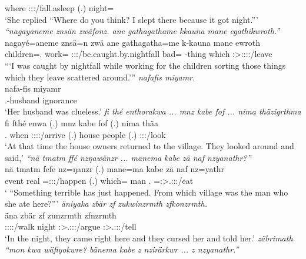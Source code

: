 \begin{exe}
	where {\Fut} \Med{} {\Emph} \Fsg:\Sbj:\Rpst:\Pfv/fall.asleep (.) night=\Char\\
	\trans `She replied ``Where do you think? I slept there because it got night.'''
	\emph{``nagayaneme znsän zwäfonz. ane gathagathame kkauna mane egathikwroth.''}\\
	\gll nagayé=aneme znsä=n zwä ane gathagatha=me k-kauna mane ewroth\\
	children=\Poss.{\Nsg} work={\Loc} \Fsg:\Sbj:\Rpst:\Pfv/be.caught.by.nightfall {\Dem} bad={\Ins} \Redup-thing which \Pl:\Sbj>\Stpl:\Obj:\Nonpast:\Ipfv:\Andat/leave\\
	\trans ```I was caught by nightfall while working for the children sorting those things which they leave scattered around.'''
	\emph{nafafis miyamr.}\\
	\gll nafa-fis miyamr\\
	\Third.\Poss-husband ignorance\\
	\trans `Her husband was clueless.'
	\emph{fi thé enthorakwa ... mnz kabe fof ... nima thäzigrthma}\\
	\gll fi fthé enwa (.) mnz kabe fof (.) nima thäa\\
	\Third.{\Abs} when \Stpl:\Sbj:\Pst:\Ipfv:\Venit/arrive (.) house people {\Emph} (.) {\Quot} \Stpl:\Sbj:\Pst:\Pfv/look\\
	\trans `At that time the house owners returned to the village. They looked around and said,'
	\emph{``nä tmatm ffé nzŋawänzr ... manema kabe zä naf nzyanathr?''}\\
	\gll nä tmatm fefe nz=ŋanzr (.) mane=ma kabe zä naf nz=yathr\\
	{\Indf} event real \Immpst=\Stsg:\Sbj:\Nonpast:\Ipfv/happen (.) which={\Char} man {\Prox} \Tsg.{\Erg} \Immpst=\Stsg:\Sbj>\Tsg.\Masc:\Obj:\Nonpast:\Ipfv/eat\\
	\trans ` ``Something terrible has just happened. From which village was the man who she ate here?'''
	\emph{äniyaka zbär zf zukwinzrmth zfkonzrmth.}\\
	\gll äna zbär zf zunzrmth zfnzrmth\\
	\Stpl:\Sbj:\Pst:\Ipfv:\Venit/walk night {\Imm} \Stpl:\Sbj>\Tsg.\F:\Obj:\Pst:\Dur/argue \Stpl:\Sbj>\Tsg.\F:\Obj:\Pst:\Dur/tell\\
	\trans `In the night, they came right here and they cursed her and told her.'
	\emph{zäbrimath ``mon kwa wäfiyokwre? bänema kabe z nzirärkwr ... z nzyanathr.''}\\

\end{exe}
